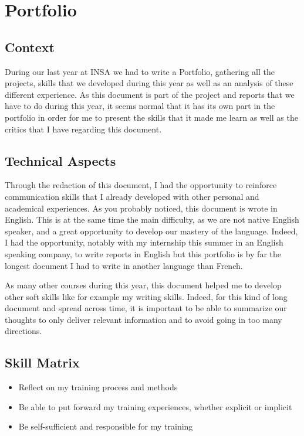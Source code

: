 \section{Portfolio}

\subsection{Context}

During our last year at INSA we had to write a Portfolio, gathering all the projects, skills that we developed during this year as well as an analysis of these different experience. As this document is part of the project and reports that we have to do during this year, it seems normal that it has its own part in the portfolio in order for me to present the skills that it made me learn as well as the critics that I have regarding this document.

\subsection{Technical Aspects}

Through the redaction of this document, I had the opportunity to reinforce communication skills that I already developed with other personal and academical experiences. As you probably noticed, this document is wrote in English. This is at the same time the main difficulty, as we are not native English speaker, and a great opportunity to develop our mastery of the language. Indeed, I had the opportunity, notably with my internship this summer in an English speaking company, to write reports in English but this portfolio is by far the longest document I had to write in another language than French. 
\\\par
As many other courses during this year, this document helped me to develop other soft skills like for example my writing skills. Indeed, for this kind of long document and spread across time, it is important to be able to summarize our thoughts to only deliver relevant information and to avoid going in too many directions. 

\subsection{Skill Matrix}

\begin{itemize}
    \item Reflect on my training process and methods
    \item Be able to put forward my training experiences, whether explicit or implicit
    \item Be self-sufficient and responsible for my training
\end{itemize}

